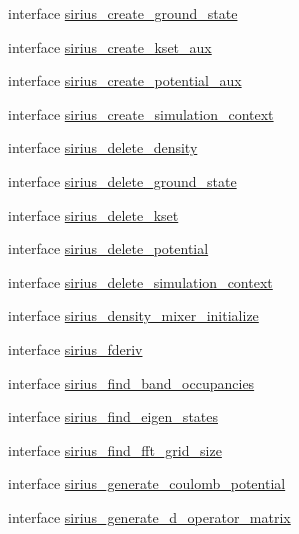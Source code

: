 \begin{DoxyCompactItemize}
\item 
interface \hyperlink{interfacesirius_1_1sirius__create__ground__state}{sirius\+\_\+create\+\_\+ground\+\_\+state}
\item 
interface \hyperlink{interfacesirius_1_1sirius__create__kset__aux}{sirius\+\_\+create\+\_\+kset\+\_\+aux}
\item 
interface \hyperlink{interfacesirius_1_1sirius__create__potential__aux}{sirius\+\_\+create\+\_\+potential\+\_\+aux}
\item 
interface \hyperlink{interfacesirius_1_1sirius__create__simulation__context}{sirius\+\_\+create\+\_\+simulation\+\_\+context}
\item 
interface \hyperlink{interfacesirius_1_1sirius__delete__density}{sirius\+\_\+delete\+\_\+density}
\item 
interface \hyperlink{interfacesirius_1_1sirius__delete__ground__state}{sirius\+\_\+delete\+\_\+ground\+\_\+state}
\item 
interface \hyperlink{interfacesirius_1_1sirius__delete__kset}{sirius\+\_\+delete\+\_\+kset}
\item 
interface \hyperlink{interfacesirius_1_1sirius__delete__potential}{sirius\+\_\+delete\+\_\+potential}
\item 
interface \hyperlink{interfacesirius_1_1sirius__delete__simulation__context}{sirius\+\_\+delete\+\_\+simulation\+\_\+context}
\item 
interface \hyperlink{interfacesirius_1_1sirius__density__mixer__initialize}{sirius\+\_\+density\+\_\+mixer\+\_\+initialize}
\item 
interface \hyperlink{interfacesirius_1_1sirius__fderiv}{sirius\+\_\+fderiv}
\item 
interface \hyperlink{interfacesirius_1_1sirius__find__band__occupancies}{sirius\+\_\+find\+\_\+band\+\_\+occupancies}
\item 
interface \hyperlink{interfacesirius_1_1sirius__find__eigen__states}{sirius\+\_\+find\+\_\+eigen\+\_\+states}
\item 
interface \hyperlink{interfacesirius_1_1sirius__find__fft__grid__size}{sirius\+\_\+find\+\_\+fft\+\_\+grid\+\_\+size}
\item 
interface \hyperlink{interfacesirius_1_1sirius__generate__coulomb__potential}{sirius\+\_\+generate\+\_\+coulomb\+\_\+potential}
\item 
interface \hyperlink{interfacesirius_1_1sirius__generate__d__operator__matrix}{sirius\+\_\+generate\+\_\+d\+\_\+operator\+\_\+matrix}
\item 

\end{DoxyCompactItemize}
